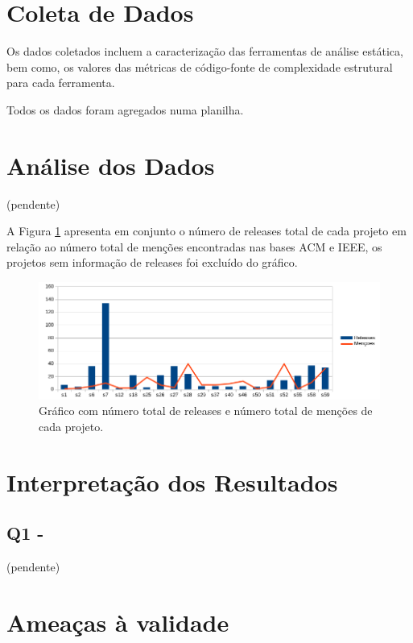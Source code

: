 \section{Coleta de Dados} \label{estudo3:coleta}

Os dados coletados incluem a caracterização das ferramentas de análise
estática, bem como, os valores das métricas de código-fonte de complexidade
estrutural para cada ferramenta.

Todos os dados foram agregados numa planilha.

\section{Análise dos Dados} \label{estudo3:analise}

(pendente)

A Figura \ref{releases-vs-mentions} apresenta em conjunto o número de releases total
de cada projeto em relação ao número total de menções encontradas nas bases ACM e IEEE,
os projetos sem informação de releases foi excluído do gráfico.

\begin{figure}[h]
  \center
  \includegraphics[scale=0.6]{imagens/releases-vs-mentions.png}
  \caption{Gráfico com número total de releases e número total de menções de cada projeto.}
  \label{releases-vs-mentions}
\end{figure}


\section{Interpretação dos Resultados} \label{estudo3:interpretacao}

\subsection{Q1 - \EstudoDoisQuestaoUm}

(pendente)

\section{Ameaças à validade}

